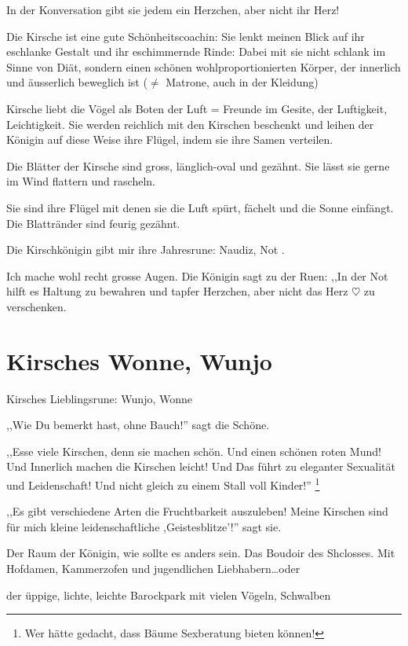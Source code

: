 \documentclass[11pt,titlepage,a5paper]{book}
\begin{document}
In der Konversation gibt sie jedem ein Herzchen, aber nicht ihr Herz!

Die Kirsche ist eine gute Schönheitscoachin: Sie lenkt meinen Blick auf ihr eschlanke Gestalt und ihr eschimmernde Rinde: Dabei mit sie nicht schlank im Sinne von Diät, sondern einen schönen wohlproportionierten Körper, der innerlich und äusserlich beweglich ist ($\neq$ Matrone, auch in der Kleidung)

Kirsche liebt die Vögel als Boten der Luft = Freunde im Gesite, der Luftigkeit, Leichtigkeit. Sie werden reichlich mit den Kirschen beschenkt und leihen der Königin auf diese Weise ihre Flügel, indem sie ihre Samen verteilen.

Die Blätter der Kirsche sind gross, länglich-oval und gezähnt. Sie lässt sie gerne im Wind flattern und rascheln.

Sie sind ihre Flügel mit denen sie die Luft spürt, fächelt und die Sonne einfängt. Die Blattränder sind feurig gezähnt.

Die Kirschkönigin gibt mir ihre Jahresrune: Naudiz, Not .

Ich mache wohl recht grosse Augen. Die Königin sagt zu der Ruen: ,,In der Not hilft es Haltung zu bewahren und tapfer Herzchen, aber nicht das Herz $\heartsuit$ zu verschenken.


\section*{Kirsches Wonne, Wunjo  }

Kirsches Lieblingsrune: Wunjo, Wonne 

,,Wie Du bemerkt hast, ohne Bauch!'' sagt die Schöne.

,,Esse viele Kirschen, denn sie machen schön. Und einen schönen roten Mund! Und Innerlich machen die Kirschen leicht! Und Das führt zu eleganter Sexualität und Leidenschaft! Und nicht gleich zu einem Stall voll Kinder!'' \footnote{Wer hätte gedacht, dass Bäume Sexberatung bieten können!}

,,Es gibt verschiedene Arten die Fruchtbarkeit auszuleben! Meine  Kirschen sind für mich kleine leidenschaftliche ,Geistesblitze'!'' sagt sie.

Der Raum der Königin, wie sollte es anders sein. Das Boudoir des Shclosses. Mit Hofdamen, Kammerzofen und jugendlichen Liebhabern\dots oder

der üppige, lichte, leichte Barockpark mit vielen Vögeln, Schwalben
\end{document}
